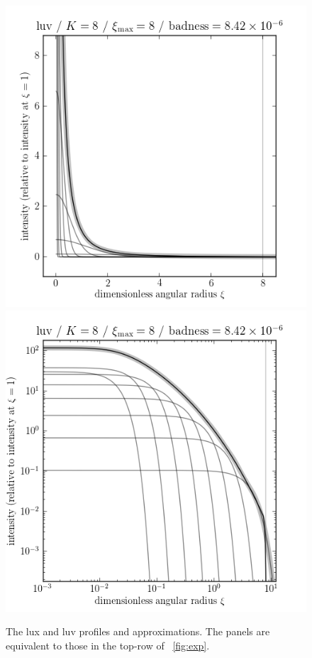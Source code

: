 \documentclass[12pt,pdftex,preprint]{aastex}
\newlength{\figurewidth}
\begin{document}
\begin{figure}
\includegraphics[width=\figurewidth]{luv_K08_MR08_profile.png}%
\includegraphics[width=\figurewidth]{luv_K08_MR08_profile_log.png}
\caption{The lux and luv profiles and approximations.  The panels are
  equivalent to those in the top-row of \figurename~\ref{fig:exp}.}
\end{figure}
\end{document}
